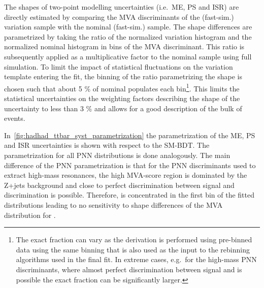 The shapes of two-point \ttbar modelling uncertainties (i.e.\ ME, PS
and ISR) are directly estimated by comparing the MVA discriminants of
the (fast-sim.) variation sample with the nominal (fast-sim.) \ttbar
sample. The shape differences are parametrized by taking the ratio of
the normalized variation histogram and the normalized nominal
histogram in bins of the MVA discriminant. This ratio is subsequently
applied as a multiplicative factor to the nominal \ttbar sample using
full simulation. To limit the impact of statistical fluctuations on
the variation template entering the fit, the binning of the ratio
parametrizing the shape is chosen such that about 5 \% of nominal
\ttbar populates each bin\footnote{The exact fraction can vary as the
  derivation is performed using pre-binned data using the same binning
  that is also used as the input to the rebinning algorithms used in
  the final fit. In extreme cases, e.g.\ for the high-mass PNN
  discriminants, where almost perfect discrimination between signal
  and \ttbar is possible the exact fraction can be significantly
  larger.}. This limits the statistical uncertainties on the weighting
factors describing the shape of the uncertainty to less than 3 \% and
allows for a good description of the bulk of \ttbar events.

In~\ref{fig:hadhad_ttbar_syst_parametrization} the parametrization of
the \ttbar ME, PS and ISR uncertainties is shown with respect to the
SM-BDT. The parametrization for all PNN distributions is done
analogously. The main difference of the PNN parametrization is that
for the PNN discriminants used to extract high-mass resonances, the
high MVA-score region is dominated by the Z+jets background and close
to perfect discrimination between signal and \ttbar discrimination is
possible. Therefore, \ttbar is concentrated in the first bin of the
fitted distributions leading to no sensitivity to shape differences of
the MVA distribution for \ttbar.

